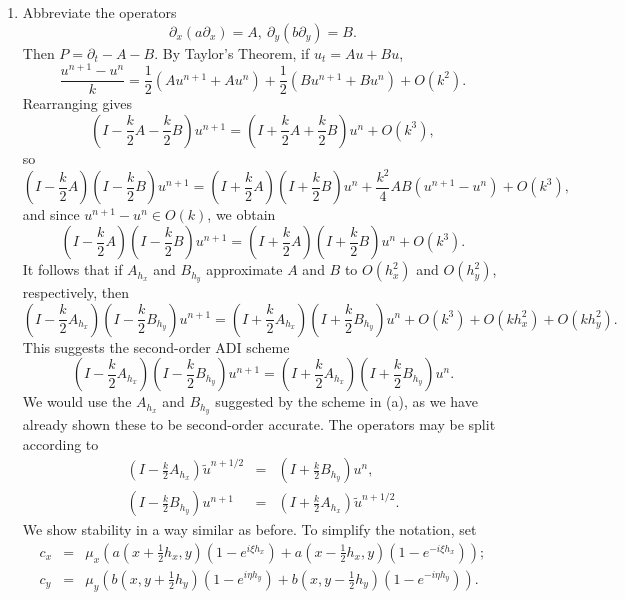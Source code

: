 \documentclass{article}
\begin{document}
\begin{enumerate}
\begin{enumerate}
\item Abbreviate the operators
\[\partial_x \left( a \partial_x \right) = A, \ 
  \partial_y \left( b \partial_y \right) = B.\]
Then \(P = \partial_t - A - B\).  By Taylor's Theorem, if \(u_t = Au + Bu\),
\[\frac{u^{n+1} - u^n}{k}
  = \frac{1}{2} \left( Au^{n+1} + Au^n \right)
  + \frac{1}{2} \left( Bu^{n+1} + Bu^n \right) + O(k^2).\]
Rearranging gives
\[\left( I - \frac{k}{2} A - \frac{k}{2} B \right) u^{n+1}
  = \left( I + \frac{k}{2} A + \frac{k}{2} B \right) u^n + O(k^3),\]
so
\[\left( I - \frac{k}{2} A \right) \left( I - \frac{k}{2} B \right) u^{n+1}
  = \left( I + \frac{k}{2} A \right) \left( I + \frac{k}{2} B \right) u^n
  + \frac{k^2}{4} A B (u^{n+1} - u^n) + O(k^3),\]
and since \(u^{n+1} - u^n \in O(k)\), we obtain
\[\left( I - \frac{k}{2} A \right) \left( I - \frac{k}{2} B \right) u^{n+1}
  = \left( I + \frac{k}{2} A \right) \left( I + \frac{k}{2} B \right) u^n + O(k^3).\]
It follows that if \(A_{h_x}\) and \(B_{h_y}\) approximate \(A\) and \(B\) to \(O(h_x^2)\) and \(O(h_y^2)\), respectively, then
\[\left( I - \frac{k}{2} A_{h_x} \right) \left( I - \frac{k}{2} B_{h_y} \right) u^{n+1}
  = \left( I + \frac{k}{2} A_{h_x} \right) \left( I + \frac{k}{2} B_{h_y} \right) u^n
  + O(k^3) + O(kh_x^2) + O(kh_y^2).\]
This suggests the second-order ADI scheme
\[\left( I - \frac{k}{2} A_{h_x} \right) \left( I - \frac{k}{2} B_{h_y} \right) u^{n+1}
  = \left( I + \frac{k}{2} A_{h_x} \right) \left( I + \frac{k}{2} B_{h_y} \right) u^n.\]
We would use the \(A_{h_x}\) and \(B_{h_y}\) suggested by the scheme in (a), as we have already shown these to be second-order accurate.  The operators may be split according to
\begin{eqnarray*}
\left( I - \frac{k}{2} A_{h_x} \right) \widetilde{u}^{n+1/2}
& = & \left( I + \frac{k}{2} B_{h_y} \right) u^n, \\
\left( I - \frac{k}{2} B_{h_y} \right) u^{n+1}
& = & \left( I + \frac{k}{2} A_{h_x} \right) \widetilde{u}^{n+1/2}.
\end{eqnarray*}
We show stability in a way similar as before.  To simplify the notation, set
\begin{eqnarray*}
c_x & = & \mu_x \left( a \left( x + \frac{1}{2} h_x, y \right) \left( 1 - e^{i\xi h_x} \right) + a \left( x - \frac{1}{2} h_x, y \right) \left( 1 - e^{-i\xi h_x} \right) \right); \\
c_y & = & \mu_y \left( b \left( x, y + \frac{1}{2} h_y \right) \left( 1 - e^{i\eta h_y} \right) + b \left( x, y - \frac{1}{2} h_y \right) \left( 1 - e^{-i\eta h_y} \right) \right).
\end{eqnarray*}

\end{enumerate}
\end{enumerate}
\end{document}
